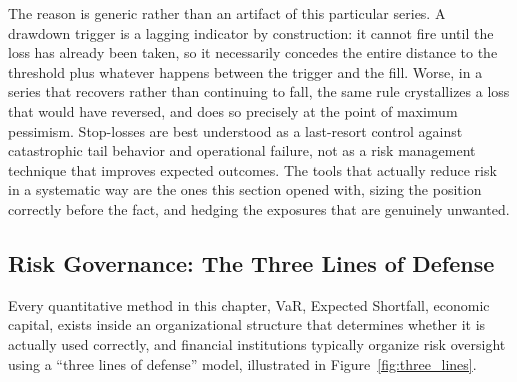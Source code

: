 \documentclass[../ai_in_finance]{subfiles}
\begin{document}
The reason is generic rather than an artifact of this particular series. A drawdown trigger is a lagging indicator by construction: it cannot fire until the loss has already been taken, so it necessarily concedes the entire distance to the threshold plus whatever happens between the trigger and the fill. Worse, in a series that recovers rather than continuing to fall, the same rule crystallizes a loss that would have reversed, and does so precisely at the point of maximum pessimism. Stop-losses are best understood as a last-resort control against catastrophic tail behavior and operational failure, not as a risk management technique that improves expected outcomes. The tools that actually reduce risk in a systematic way are the ones this section opened with, sizing the position correctly before the fact, and hedging the exposures that are genuinely unwanted.

\subsection{Risk Governance: The Three Lines of Defense}

Every quantitative method in this chapter, VaR, Expected Shortfall, economic capital, exists inside an organizational structure that determines whether it is actually used correctly, and financial institutions typically organize risk oversight using a ``three lines of defense'' model, illustrated in Figure~\ref{fig:three_lines}.

\begin{figure}[htbp]
\centering
\begin{lrbox}{\bookmeasuredbox}
\end{lrbox}
\ifdim\wd\bookmeasuredbox<0.65\linewidth
\setlength{\bookcapwidth}{0.65\linewidth}
\else
\setlength{\bookcapwidth}{\wd\bookmeasuredbox}
\fi
{}
\end{figure}
\end{document}

